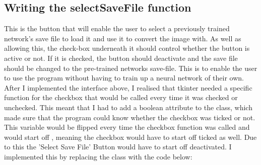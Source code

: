 \documentclass{report}
\begin{document}
\subsection{Writing the selectSaveFile function}
This is the button that will enable the user to select a previously trained network's save file to load it and use it to convert the image with. As well as allowing this, the check-box underneath it should control whether the button is active or not. If it is checked, the button should deactivate and the save file should be changed to the pre-trained networks save-file. This is to enable the user to use the program without having to train up a neural network of their own.
\newline
After I implemented the interface above, I realised that tkinter needed a specific function for the checkbox that would be called every time it was checked or unchecked. This meant that I had to add a boolean attribute to the class, which made sure that the program could know whether the checkbox was ticked or not. This variable would be flipped every time the checkbox function was called and would start off , meaning the checkbox would have to start off ticked as well. Due to this the 'Select Save File' Button would have to start off deactivated.
\newline
I implemented this by replacing the  class with the code below:
\end{document}
